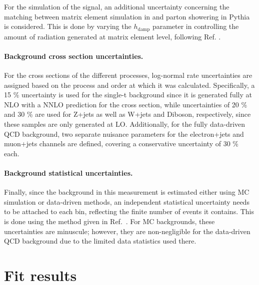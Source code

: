 For the simulation of the \ttbar signal, an additional uncertainty concerning the matching between matrix element simulation in \powheg and parton showering in Pythia is considered. This is done by varying the $h_{\mathrm{damp}}$ parameter in \powheg controlling the amount of radiation generated at matrix element level, following Ref. \cite{CMS:TOP-16-021}.

\paragraph{Background cross section uncertainties.}

For the cross sections of the different processes, log-normal rate uncertainties are assigned based on the process and order at which it was calculated. Specifically, a 15 \% uncertainty is used for the single-t background since it is generated fully at NLO with a NNLO prediction for the cross section, while uncertainties of 20 \% and 30 \% are used for Z+jets as well as W+jets and Diboson, respectively, since these samples are only generated at LO. Additionally, for the fully data-driven QCD background, two separate nuisance parameters for the electron+jets and muon+jets channels are defined, covering a conservative uncertainty of 30 \% each.

\paragraph{Background statistical uncertainties.}

Finally, since the background in this measurement is estimated either using MC simulation or data-driven methods, an independent statistical uncertainty needs to be attached to each bin, reflecting the finite number of events it contains. This is done using the method given in Ref.~\cite{Barlow:1993dm}. For MC backgrounds, these uncertainties are minuscule; however, they are non-negligible for the data-driven QCD background due to the limited data statistics used there.


\section{Fit results}
\label{sec:ttxs:fitresults}

